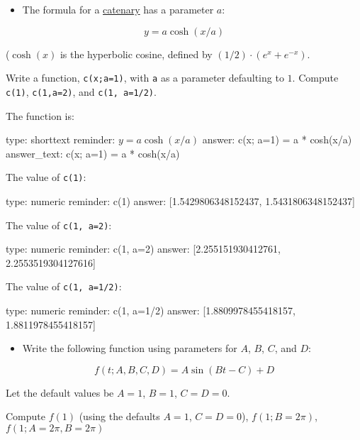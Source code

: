 \documentclass[12pt]{article}
\begin{document}
\begin{itemize}
\itemsep1pt\parskip0pt
\item
  The formula for a
  \href{http://en.wikipedia.org/wiki/Catenary}{catenary} has a parameter
  $a$:
\end{itemize}

\[
y = a \cosh(x/a)
\]

($\cosh(x)$ is the hyperbolic cosine, defined by
$(1/2) \cdot (e^x + e^{-x})$.

Write a function, \texttt{c(x;a=1)}, with \texttt{a} as a parameter
defaulting to $1$. Compute \texttt{c(1)}, \texttt{c(1,a=2)}, and
\texttt{c(1, a=1/2)}.

The function is:

\begin{answer}
type: shorttext
reminder: \( y = a \cosh(x/a) \)
answer: c(x; a=1) = a * cosh(x/a)
answer_text: c(x; a=1) = a * cosh(x/a) 
\end{answer}

The value of \texttt{c(1)}:

\begin{answer}
    type: numeric
    reminder: c(1)
    answer: [1.5429806348152437, 1.5431806348152437]

\end{answer}

The value of \texttt{c(1, a=2)}:

\begin{answer}
    type: numeric
    reminder: c(1, a=2)
    answer: [2.255151930412761, 2.2553519304127616]

\end{answer}

The value of \texttt{c(1, a=1/2)}:

\begin{answer}
    type: numeric
    reminder: c(1, a=1/2)
    answer: [1.8809978455418157, 1.8811978455418157]

\end{answer}

\begin{itemize}
\itemsep1pt\parskip0pt
\item
  Write the following function using parameters for $A$, $B$, $C$, and
  $D$:
\end{itemize}

\[
f(t;A,B,C,D) = A\sin(Bt - C) + D
\]

Let the default values be $A=1$, $B=1$, $C=D=0$.

Compute $f(1)$ (using the defaults $A=1$, $C=D=0$), $f(1; B=2\pi)$,
$f(1; A=2\pi, B=2\pi)$
\end{document}
